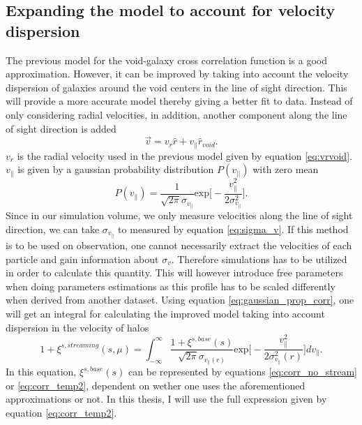 \subsection{Expanding the model to account for velocity dispersion}
The previous model for the void-galaxy cross correlation function is a good
approximation. However, it can be improved by taking into account the velocity
dispersion of galaxies around the void centers in the line of sight direction.
This will provide a more accurate model thereby giving a better fit to data.
Instead of only considering radial velocities, in addition, another component along the line
of sight direction is added
\begin{equation}
    \vec{v}=v_r\hat{r}+v_\parallel \hat{r}_{void}.
\end{equation}
$v_r$ is the radial velocity used in the previous model given by equation
\ref{eq:vrvoid}. $v_\parallel$ is given by a gaussian probability distribution
$P(v_{\vert\vert})$ with zero mean
\begin{equation}\label{eq:gaussian_prop_corr}
    P(v_\parallel)=\frac{1}{\sqrt{2\pi}\sigma_{v_{\parallel}}}\mathrm{exp}\Big[-\frac{v_\parallel^2}{2\sigma_{v_\parallel}^2}\Big].
\end{equation}
Since in our simulation volume, we only measure velocities along the line of
sight direction, we can take $\sigma_{v_{\parallel}}$ to measured by equation
\ref{eq:sigma_v}. If this method is to be used on observation, one cannot necessarily extract the velocities of each particle and gain information about $\sigma_v$. Therefore simulations has to be utilized in order to calculate this quantity. This will however introduce free parameters when doing parameters estimations as this profile has to be scaled differently when derived from another dataset. Using equation \ref{eq:gaussian_prop_corr}, one will get an integral for calculating the improved
model taking into account dispersion in the velocity of halos \cite{BeyondBAO}
\begin{equation}\label{eq:corr_stream}
    1+\xi^{s,streaming}(s,\mu)=\int_{-\infty}^\infty\frac{1+\xi^{s,base}(s)}{\sqrt{2\pi}\sigma_{v_{\parallel}(r)}}\mathrm{exp}\Big[-\frac{v_\parallel^2}{2\sigma_{v_\parallel}^2(r)}\Big]dv_\parallel.
\end{equation}
In this equation, $\xi^{s,base}(s)$ can be represented by equations \ref{eq:corr_no_stream} or \ref{eq:corr_temp2}, dependent on wether one uses the aforementioned approximations or not. In this thesis, I will use the full expression given by equation \ref{eq:corr_temp2}.
